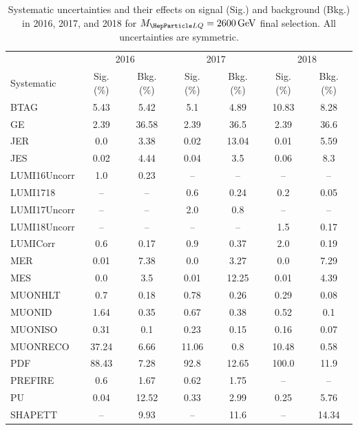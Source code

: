 \begin{table}[H]
	\begin{center}
        \begin{footnotesize}
			\caption{Systematic uncertainties and their effects on signal (Sig.) and background (Bkg.) in 2016, 2017, and 2018 for $\MLQ = \SI{2600}{GeV}$ final selection. All uncertainties are symmetric.}
			\begin{tabular}{lcccccc} \hline \hline
				& \multicolumn{2}{c}{2016} & \multicolumn{2}{c}{2017} & \multicolumn{2}{c}{2018} \\
				Systematic & Sig. (\%) & Bkg. (\%) & Sig. (\%) & Bkg. (\%) & Sig. (\%) & Bkg. (\%) \\ \hline
				BTAG &  5.43  &  5.42 &  5.1  &  4.89 &  10.83  &  8.28 \\
				GE &  2.39  &  36.58 &  2.39  &  36.5 &  2.39  &  36.6 \\
				JER &  0.0  &  3.38 &  0.02  &  13.04 &  0.01  &  5.59 \\
				JES &  0.02  &  4.44 &  0.04  &  3.5 &  0.06  &  8.3 \\
				LUMI16Uncorr &  1.0  &  0.23 & -- & -- & -- & -- \\
				LUMI1718 & -- & -- &  0.6  &  0.24 &  0.2  &  0.05 \\
				LUMI17Uncorr & -- & -- &  2.0  &  0.8 & -- & -- \\
				LUMI18Uncorr & -- & -- & -- & -- &  1.5  &  0.17 \\
				LUMICorr &  0.6  &  0.17 &  0.9  &  0.37 &  2.0  &  0.19 \\
				MER &  0.01  &  7.38 &  0.0  &  3.27 &  0.0  &  7.29 \\
				MES &  0.0  &  3.5 &  0.01  &  12.25 &  0.01  &  4.39 \\
				MUONHLT &  0.7  &  0.18 &  0.78  &  0.26 &  0.29  &  0.08 \\
				MUONID &  1.64  &  0.35 &  0.67  &  0.38 &  0.52  &  0.1 \\
				MUONISO &  0.31  &  0.1 &  0.23  &  0.15 &  0.16  &  0.07 \\
				MUONRECO &  37.24  &  6.66 &  11.06  &  0.8 &  10.48  &  0.58 \\
				PDF &  88.43  &  7.28 &  92.8  &  12.65 &  100.0  &  11.9 \\
				PREFIRE &  0.6  &  1.67 &  0.62  &  1.75 & -- & -- \\
				PU &  0.04  &  12.52 &  0.33  &  2.99 &  0.25  &  5.76 \\
				SHAPETT & -- &  9.93 & -- &  11.6 & -- &  14.34 \\

\end{tabular}
\end{footnotesize}
\end{center}
\end{table}
